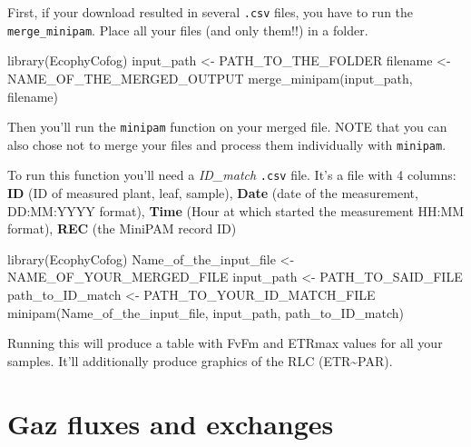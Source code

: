 \documentclass[
  12pt,
  american,
  a4paper,
  extrafontsizes,onecolumn,openright
  ]{memoir}
\newenvironment{Shaded}{\begin{snugshade}}{\end{snugshade}}
\newcommand{\FunctionTok}[1]{\textcolor[rgb]{0.00,0.00,0.00}{#1}}
\newcommand{\NormalTok}[1]{#1}
\newcommand{\OtherTok}[1]{\textcolor[rgb]{0.56,0.35,0.01}{#1}}
\begin{document}
First, if your download resulted in several \texttt{.csv} files, you have to run the \texttt{merge\_minipam}.
Place all your files (and only them!!) in a folder.

\scriptsize

\begin{Shaded}
\begin{Highlighting}[]
\FunctionTok{library}\NormalTok{(EcophyCofog)}
\NormalTok{input\_path }\OtherTok{\textless{}{-}}\NormalTok{ PATH\_TO\_THE\_FOLDER}
\NormalTok{filename }\OtherTok{\textless{}{-}}\NormalTok{ NAME\_OF\_THE\_MERGED\_OUTPUT}
\FunctionTok{merge\_minipam}\NormalTok{(input\_path, filename)}
\end{Highlighting}
\end{Shaded}

\normalsize

Then you'll run the \texttt{minipam} function on your merged file.
NOTE that you can also chose not to merge your files and process them individually with \texttt{minipam}.

To run this function you'll need a \emph{ID\_match} \texttt{.csv} file.
It's a file with 4 columns: \textbf{ID} (ID of measured plant, leaf, sample), \textbf{Date} (date of the measurement, DD:MM:YYYY format), \textbf{Time} (Hour at which started the measurement HH:MM format), \textbf{REC} (the MiniPAM record ID)

\scriptsize

\begin{Shaded}
\begin{Highlighting}[]
\FunctionTok{library}\NormalTok{(EcophyCofog)}
\NormalTok{Name\_of\_the\_input\_file }\OtherTok{\textless{}{-}}\NormalTok{ NAME\_OF\_YOUR\_MERGED\_FILE}
\NormalTok{input\_path }\OtherTok{\textless{}{-}}\NormalTok{ PATH\_TO\_SAID\_FILE}
\NormalTok{path\_to\_ID\_match }\OtherTok{\textless{}{-}}\NormalTok{ PATH\_TO\_YOUR\_ID\_MATCH\_FILE}
\FunctionTok{minipam}\NormalTok{(Name\_of\_the\_input\_file, input\_path, path\_to\_ID\_match)}
\end{Highlighting}
\end{Shaded}

\normalsize

Running this will produce a table with FvFm and ETRmax values for all your samples.
It'll additionally produce graphics of the RLC (ETR\textasciitilde PAR).

\hypertarget{gaz-fluxes-and-exchanges}{%
\chapter{Gaz fluxes and exchanges}\label{gaz-fluxes-and-exchanges}}
\end{document}
